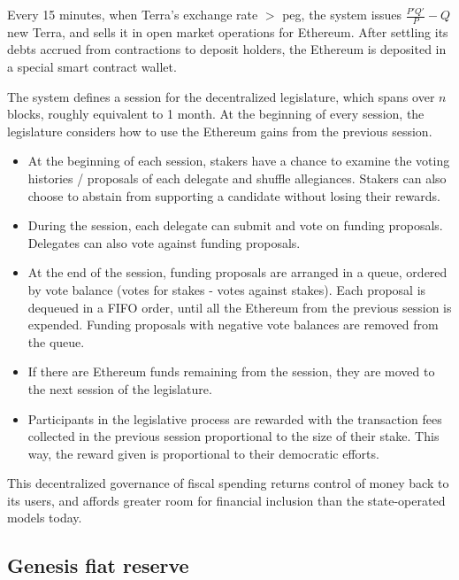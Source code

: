 \documentclass{article}
\begin{document}
Every 15 minutes, when Terra's exchange rate $>$ peg, the system issues $\frac{P{'} Q{'}}{P} - Q$ new Terra, and sells it in open market operations for Ethereum. After settling its debts accrued from contractions to deposit holders, the Ethereum is deposited in a special smart contract wallet.

The system defines a session for the decentralized legislature, which spans over $n$ blocks, roughly equivalent to 1 month. At the beginning of every session, the legislature considers how to use the Ethereum gains from the previous session. 

\begin{itemize}
    \item At the beginning of each session, stakers have a chance to examine the voting histories / proposals of each delegate and shuffle allegiances. Stakers can also choose to abstain from supporting a candidate without losing their rewards. 
    
    \item During the session, each delegate can submit and vote on funding proposals. Delegates can also vote against funding proposals.
    
    \item At the end of the session, funding proposals are arranged in a queue, ordered by vote balance (votes for stakes - votes against stakes). Each proposal is dequeued in a FIFO order, until all the Ethereum from the previous session is expended. Funding proposals with negative vote balances are removed from the queue. 
    
    \item If there are Ethereum funds remaining from the session, they are moved to the next session of the legislature.
    
    \item Participants in the legislative process are rewarded with the transaction fees collected in the previous session proportional to the size of their stake. This way, the reward given is proportional to their democratic efforts.
    
\end{itemize}


This decentralized governance of fiscal spending returns control of money back to its users, and affords greater room for financial inclusion than the state-operated models today. 

\subsection{Genesis fiat reserve}
\end{document}
